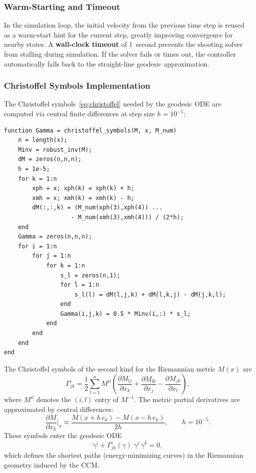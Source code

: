 \documentclass[11pt,a4paper]{article}
\begin{document}
\subsubsection{Warm-Starting and Timeout}

In the simulation loop, the initial velocity from the previous time step is reused as a warm-start hint for the current step, greatly improving convergence for nearby states.  A \textbf{wall-clock timeout} of 1~second prevents the shooting solver from stalling during simulation.  If the solver fails or times out, the controller automatically falls back to the straight-line geodesic approximation.

\subsubsection{Christoffel Symbols Implementation}

The Christoffel symbols~\eqref{eq:christoffel} needed by the geodesic ODE are computed via central finite differences at step size \(h = 10^{-5}\):

\begin{lstlisting}
function Gamma = christoffel_symbols(M, x, M_num)
    n = length(x);
    Minv = robust_inv(M);
    dM = zeros(n,n,n);
    h = 1e-5;
    for k = 1:n
        xph = x; xph(k) = xph(k) + h;
        xmh = x; xmh(k) = xmh(k) - h;
        dM(:,:,k) = (M_num(xph(3),xph(4)) ...
                   - M_num(xmh(3),xmh(4))) / (2*h);
    end
    Gamma = zeros(n,n,n);
    for i = 1:n
        for j = 1:n
            for k = 1:n
                s_l = zeros(n,1);
                for l = 1:n
                    s_l(l) = dM(l,j,k) + dM(l,k,j) - dM(j,k,l);
                end
                Gamma(i,j,k) = 0.5 * Minv(i,:) * s_l;
            end
        end
    end
end
\end{lstlisting}

\begin{codemath}
The Christoffel symbols of the second kind for the Riemannian metric \(M(x)\) are
\[
\Gamma^i_{jk}
=
\frac{1}{2}
\sum_{l=1}^{n}
M^{il}
\left(
\frac{\partial M_{lj}}{\partial x_k}
+
\frac{\partial M_{lk}}{\partial x_j}
-
\frac{\partial M_{jk}}{\partial x_l}
\right),
\]
where \(M^{il}\) denotes the \((i,l)\) entry of \(M^{-1}\). The metric partial derivatives are approximated by central differences:
\[
\frac{\partial M}{\partial x_k}\bigg|_x
\approx
\frac{M(x + h\, e_k) - M(x - h\, e_k)}{2h},
\qquad h = 10^{-5}.
\]
These symbols enter the geodesic ODE
\[
\ddot\gamma^i + \Gamma^i_{jk}(\gamma)\;\dot\gamma^j\,\dot\gamma^k = 0,
\]
which defines the shortest paths (energy-minimizing curves) in the Riemannian geometry induced by the CCM.
\end{codemath}
\end{document}
